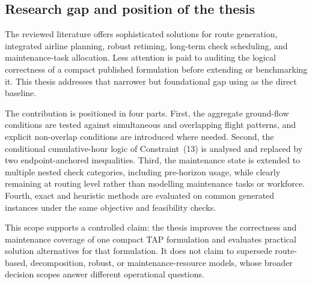 \subsection{Research gap and position of the thesis}

The reviewed literature offers sophisticated solutions for route generation,
integrated airline planning, robust retiming, long-term check scheduling, and
maintenance-task allocation. Less attention is paid to auditing the logical
correctness of a compact published formulation before extending or benchmarking
it. This thesis addresses that narrower but foundational gap using
\citet{khaled2018compact} as the direct baseline.

The contribution is positioned in four parts. First, the aggregate ground-flow
conditions are tested against simultaneous and overlapping flight patterns, and
explicit non-overlap conditions are introduced where needed. Second, the
conditional cumulative-hour logic of Constraint~(13) is analysed and replaced
by two endpoint-anchored inequalities. Third, the maintenance state is extended
to multiple nested check categories, including pre-horizon usage, while clearly
remaining at routing level rather than modelling maintenance tasks or workforce.
Fourth, exact and heuristic methods are evaluated on common generated instances
under the same objective and feasibility checks.

This scope supports a controlled claim: the thesis improves the correctness and
maintenance coverage of one compact TAP formulation and evaluates practical
solution alternatives for that formulation. It does not claim to supersede
route-based, decomposition, robust, or maintenance-resource models, whose
broader decision scopes answer different operational questions.
